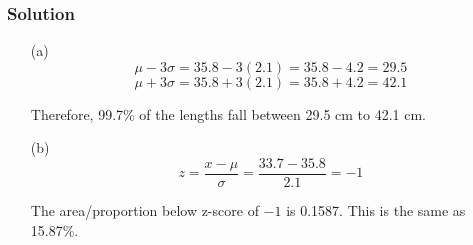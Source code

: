\subsubsection*{Solution}
\begin{enumerate}
    \item[(a)] 
\[
\mu - 3\sigma = 35.8 - 3(2.1) = 35.8 - 4.2 = 29.5
\]
\[
\mu + 3\sigma = 35.8 + 3(2.1) = 35.8 + 4.2 = 42.1
\]

Therefore, 99.7\% of the lengths fall between 29.5 cm to 42.1 cm.

    \item[(b)] \[
z = \frac{x - \mu}{\sigma} = \frac{33.7 - 35.8}{2.1} = -1
\]

The area/proportion below z-score of $-1$ is 0.1587. This is the same as 15.87\%.

\end{enumerate}




 

 